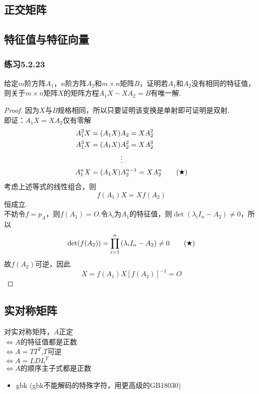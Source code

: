 \documentclass[11pt,a4paper,oneside,fontset=windows]{ctexbook}
\begin{document}
\subsection{正交矩阵}
\subsection{特征值与特征向量}
\subsubsection{练习5.2.23}
给定$m$阶方阵$A_1$，$n$阶方阵$A_2$和$m\times n$矩阵$B$，证明若$A_1$和$A_2$没有相同的特征值，则关于$m\times n$矩阵$X$的矩阵方程$A_1X-XA_2=B$有唯一解.\\
\begin{proof}
  因为$X$与$B$规格相同，所以只要证明该变换是单射即可证明是双射.\\
  即证：$A_1X=XA_2$仅有零解
  \begin{align*}
    A_1^2X=(A_1X) & A_2=XA_2^2                      \\
    A_1^3X=(A_1X) & A_2^2=XA_2^3                    \\
                  & \vdots                          \\
    A_1^nX=(A_1X) & A_2^{n-1}=XA_2^n\tag{\ding{72}}
  \end{align*}
  考虑上述等式的线性组合，则
  $$f(A_1)X=Xf(A_2)$$
  恒成立.\\
  不妨令$f=p_A$，则$f(A_1)=O$.令$\lambda_i$为$A_1$的特征值，则$\det(\lambda_iI_n-A_2)\neq 0$，所以
  \begin{align*}
    \det(f(A_2))=\prod\limits_{i=1}^{n}{(\lambda_i I_n-A_2)}\neq 0 \tag{\ding{72}}
  \end{align*}
  故$f(A_2)$可逆，因此$$X=f(A_1)X\left[f(A_2)\right]^{-1}=O$$
\end{proof}
\subsection{实对称矩阵}
对实对称矩阵，$A$正定\\$\iff$$A$的特征值都是正数\\$\iff$$A=TT^T$,$T$可逆\\$\iff$$A=LDL^T$\\$\iff$$A$的顺序主子式都是正数
\newpage

\newpage
\begin{itemize}
  \item gbk (gbk不能解码的特殊字符，用更高级的GB18030)
\end{itemize}
\end{document}
